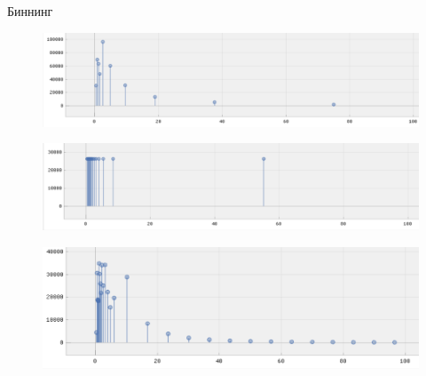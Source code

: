 \documentclass[fullscreen=true,russian,compress,%
	hyperref={unicode,bookmarks=false}]{presentation}
\begin{document}

\begin{frame}{Биннинг}
   \begin{figure}[h!] 
      \centering
      \includegraphics[scale=0.37]{images/rig_dynamic_binning.png}
   \end{figure}
   \begin{figure}[h!]
      \centering
      \includegraphics[scale=0.37]{images/rig_median_binning.png}
   \end{figure}
   \begin{figure}[h!]
      \centering
      \includegraphics[scale=0.46]{images/hybrid_binningpng.png}
   \end{figure}
\end{frame}
\end{document}
